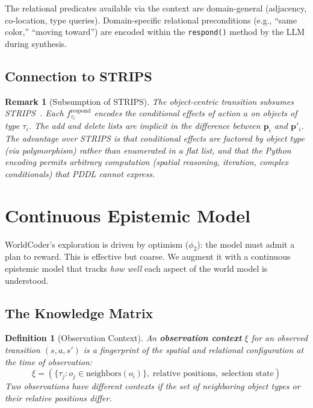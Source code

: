 \documentclass{article}
\newtheorem{definition}{Definition}
\newtheorem{remark}{Remark}
\begin{document}
The relational predicates available via the context are domain-general
(adjacency, co-location, type queries).  Domain-specific relational
preconditions (e.g., ``same color,'' ``moving toward'') are encoded within
the \texttt{respond()} method by the LLM during synthesis.

\subsection{Connection to STRIPS}
\label{sec:strips_connection}

\begin{remark}[Subsumption of STRIPS]
The object-centric transition subsumes STRIPS~\cite{fikes1971strips}.  Each
$f_{\tau_i}^{\text{respond}}$ encodes the conditional effects of action $a$ on
objects of type $\tau_i$.  The add and delete lists are implicit in the
difference between $\mathbf{p}_i$ and $\mathbf{p}'_i$.  The advantage over
STRIPS is that conditional effects are factored by object type (via
polymorphism) rather than enumerated in a flat list, and that the Python
encoding permits arbitrary computation (spatial reasoning, iteration, complex
conditionals) that PDDL cannot express.
\end{remark}



\section{Continuous Epistemic Model}
\label{sec:epistemic}

WorldCoder's exploration is driven by optimism ($\phi_2$): the model must
admit a plan to reward.  This is effective but coarse.  We augment it with a
continuous epistemic model that tracks \emph{how well} each aspect of the
world model is understood.

\subsection{The Knowledge Matrix}
\label{sec:knowledge_matrix}

\begin{definition}[Observation Context]
\label{def:obs_context}
An \textbf{observation context} $\xi$ for an observed transition
$(s, a, s')$ is a fingerprint of the spatial and relational configuration at
the time of observation:
\begin{equation}
    \xi = (\{\tau_j : o_j \in \text{neighbors}(o_i)\}, \;
           \text{relative positions}, \;
           \text{selection state})
\end{equation}
Two observations have \emph{different} contexts if the set of neighboring
object types or their relative positions differ.
\end{definition}
\end{document}
